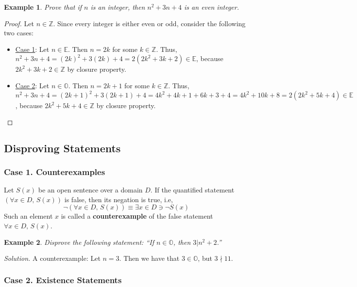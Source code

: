 \documentclass[10pt,reqno]{book}
\theoremstyle{plain}
\newtheorem{example}{Example}
\def\Z{\mathbb{Z}}
\def\E{\mathbb{E}}
\def\O{\mathbb{O}}
\begin{document}
	\begin{example}
		Prove that if $ n $ is an integer, then $ n^2 + 3n + 4 $ is an even integer.
	\end{example}

	\begin{proof}
		Let $ n \in \Z $. Since every integer is either even or odd, consider the following two cases:
			\begin{itemize}
				\item \underline{Case 1}: Let $ n \in \E $. Then $ n = 2k $ for some $ k \in \Z $. Thus, $ n^2 + 3n + 4 = (2k)^2 + 3(2k) + 4 = 2(2k^2 + 3k + 2) \in \E $, because $ 2k^2 + 3k + 2 \in \Z $ by closure property.
				\item \underline{Case 2}: Let $ n \in \O $. Then $ n = 2k+1 $ for some $ k \in \Z $. Thus, $ n^2 + 3n + 4 = (2k+1)^2 + 3(2k+1) + 4 = 4k^2 + 4k + 1 + 6k + 3 + 4 = 4k^2 + 10k + 8 = 2(2k^2 + 5k + 4) \in \E $, because $ 2k^2 + 5k + 4 \in \Z $ by closure property.
			\end{itemize}
	\end{proof}

	\subsection*{Disproving Statements}
	
	\subsubsection*{Case 1. Counterexamples} Let $ S(x) $ be an open sentence over a domain $ D $. If the quantified statement $ (\forall x \in D, \, S(x)) $ is false, then its negation is true, i.e,
	\[ \neg (\forall x \in D, \, S(x)) \equiv \exists x \in D \ni \neg S(x) \]
	Such an element $ x $ is called a \textbf{counterexample} of the false statement $ \forall x \in D, \, S(x) $.\\
	
	\begin{example}
		Disprove the following statement: ``If $ n \in \O $, then $ 3 | n^2 + 2 $.''
	\end{example}
	\noindent \textit{Solution.} A counterexample: Let $ n = 3 $. Then we have that $ 3 \in \O $, but $ 3 \nmid 11 $.
	
	\subsubsection*{Case 2. Existence Statements}
	
\end{document}
